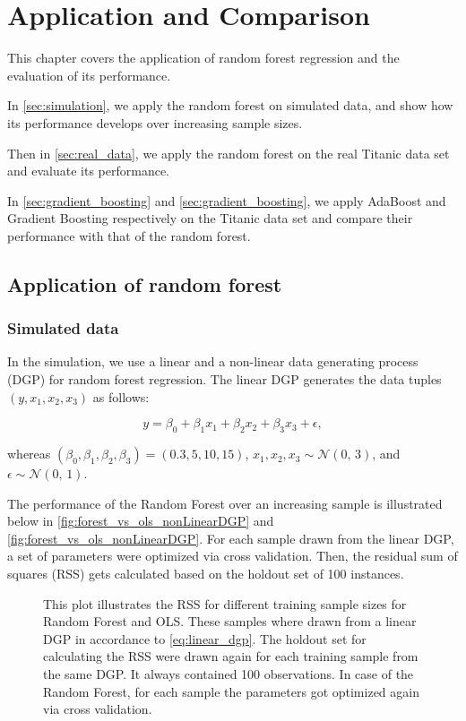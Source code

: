 \chapter{Application and Comparison}
This chapter covers the application of random forest regression and the evaluation of its performance.

In \autoref{sec:simulation}, we apply the random forest on simulated data, 
and show how its performance develops over increasing sample sizes.

Then in \autoref{sec:real_data}, we apply the random forest on the real Titanic data set \cite{titanicData}
and evaluate its performance.

In \autoref{sec:gradient_boosting} and \autoref{sec:gradient_boosting}, we apply AdaBoost and Gradient
Boosting respectively on the Titanic data set and  compare their performance with that of the random forest.

\section{Application of random forest}
\subsection{Simulated data}
\label{sec:simulation}
In the simulation, we use a linear and a non-linear data generating process (DGP) for random forest regression.
The linear DGP generates the data tuples \( (y, x_{1}, x_{2}, x_{3}) \) as follows:

\begin{equation}\label{eq:linear_dgp}
    y = \beta_{0} + \beta_{1} x_{1} + \beta_{2} x_{2} + \beta_{3} x_{3} + \epsilon,
\end{equation}

whereas \( (\beta_{0}, \beta_{1}, \beta_{2}, \beta_{3}) = (0.3, 5, 10, 15) \),
\( x_{1}, x_{2}, x_{3} \sim \mathcal{N}(0,\,3) \), and \( \epsilon \sim \mathcal{N}(0,\,1) \).

The performance of the Random Forest over an increasing sample is illustrated
below in \autoref{fig:forest_vs_ols_nonLinearDGP} and \autoref{fig:forest_vs_ols_nonLinearDGP}.
For each sample drawn from the linear DGP, a set of parameters
were optimized via cross validation. Then, the residual sum of squares (RSS) gets calculated
based on the holdout set of 100 instances.

\begin{figure}[H]
    \captionsetup{format=plain}
    \caption
        {This plot illustrates the RSS for different training sample sizes for Random Forest and OLS.
        These samples where drawn from a linear DGP in accordance to \autoref{eq:linear_dgp}.
        The holdout set for calculating the RSS were drawn again for each training sample from the same DGP.
        It always contained 100 observations. In case of the Random Forest, for each sample the parameters
        got optimized again via cross validation.
        }
    \label{fig:forest_vs_ols_linearDGP}
\end{figure}

